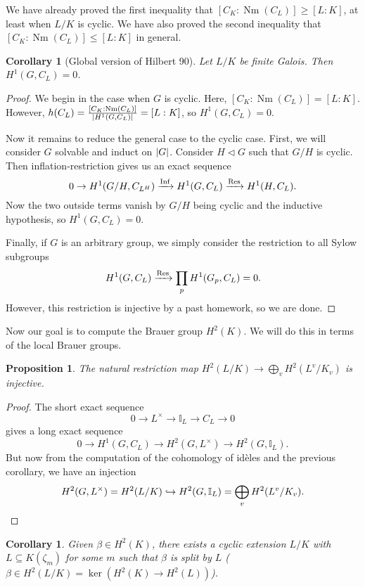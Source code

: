 \documentclass[leqno, openany]{memoir}
\newtheorem{cor}[thm]{Corollary}
\newtheorem{prop}[thm]{Proposition}
\theoremstyle{definition}
\theoremstyle{remark}
\theoremstyle{plain}
\theoremstyle{definition}
\theoremstyle{remark}
\newcommand{\I}{\mathbb{I}}
\DeclareMathOperator{\Inf}{Inf}
\DeclareMathOperator{\Nm}{Nm}
\begin{document}
We have already proved the first inequality that $[C_K : \Nm(C_L)] \geq [L:K]$, at least when $L/K$ is cyclic. We have also proved the second inequality that $[C_K:\Nm(C_L)] \leq [L:K]$ in general.

\begin{cor}[Global version of Hilbert 90]
    Let $L/K$ be finite Galois. Then $H^1(G, C_L) = 0$.
\end{cor}

\begin{proof}
    We begin in the case when $G$ is cyclic. Here, $[C_K : \Nm(C_L)] = [L:K]$. However, $h(C_L) = \frac{[C_K:\Nm(C_L)]}{\abs{H^1(G, C_L)}} = [L:K]$, so $H^1(G, C_L) = 0$.

    Now it remains to reduce the general case to the cyclic case. First, we will consider $G$ solvable and induct on $\abs{G}$. Consider $H \triangleleft G$ such that $G/H$ is cyclic. Then inflation-restriction gives us an exact sequence
    \[ 0 \to H^1(G/H, C_{L^H}) \xrightarrow{\Inf} H^1(G, C_L) \xrightarrow{\Res} H^1(H, C_L). \]
    Now the two outside terms vanish by $G/H$ being cyclic and the inductive hypothesis, so $H^1(G, C_L) = 0$.

    Finally, if $G$ is an arbitrary group, we simply consider the restriction to all Sylow subgroups
    \[ H^1(G, C_L) \xrightarrow{\Res} \prod_p H^1(G_p, C_L) = 0. \]
    However, this restriction is injective by a past homework, so we are done.
\end{proof}

Now our goal is to compute the Brauer group $H^2(K)$. We will do this in terms of the local Brauer groups.

\begin{prop}
    The natural restriction map $H^2(L/K) \to \bigoplus_v H^2(L^v/K_v)$ is injective.
\end{prop}

\begin{proof}
    The short exact sequence 
    \[ 0 \to L^{\times} \to \I_L \to C_L \to 0 \]
    gives a long exact sequence
    \[ 0 \to H^1(G, C_L) \to H^2(G, L^{\times}) \to H^2(G, \I_L). \]
    But now from the computation of the cohomology of id\`eles and the previous corollary, we have an injection
    \[ H^2(G, L^{\times}) = H^2(L/K) \hookrightarrow H^2(G, \I_L) = \bigoplus_v H^2(L^v/K_v). \qedhere \]
\end{proof}

\begin{cor}
    Given $\beta \in H^2(K)$, there exists a cyclic extension $L/K$ with $L \subseteq K(\zeta_m)$ for some $m$ such that $\beta$ is split by $L$ ($\beta \in H^2(L/K) = \ker(H^2(K) \to H^2(L))$).
\end{cor}
\end{document}
